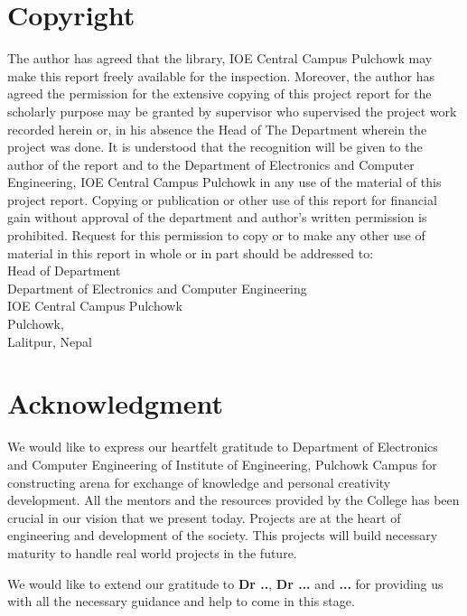 \documentclass[12pt]{article}
\begin{document}
\section*{Copyright}
The author has agreed that the library, IOE Central Campus Pulchowk may make this report freely available for the inspection. Moreover, the author has agreed the permission for the extensive copying of this project report for the scholarly purpose may be granted by supervisor who supervised the project work recorded herein or, in his absence the Head of The Department wherein the project was done. It is understood that the recognition will be given to the author of the report and to the Department of Electronics and Computer Engineering, IOE Central Campus Pulchowk in any use of the material of this project report. Copying or publication or other use of this report for financial gain without approval of the department and author's written permission is prohibited. Request for this permission to copy or to make any other use of material in this report in whole or in part should be addressed to: \\[1cm]
Head of Department \\
Department of Electronics and Computer Engineering \\
IOE Central Campus Pulchowk\\
Pulchowk,\\
Lalitpur, Nepal
\clearpage

\section*{Acknowledgment}
\par
We would like to express our heartfelt gratitude to Department of Electronics and Computer Engineering of Institute of Engineering, Pulchowk Campus for constructing arena for exchange of knowledge and personal creativity development. All the mentors and the resources provided by the College has been crucial in our vision that we present today. Projects are at the heart of engineering and development of the society. This projects will build necessary maturity to handle real world projects in the future.
\par
We would like to extend our gratitude to \textbf{Dr ..}, \textbf{Dr ...} and \textbf{...} for providing us with all the necessary guidance and help to come in this stage. \\[1cm]
\clearpage
\end{document}
